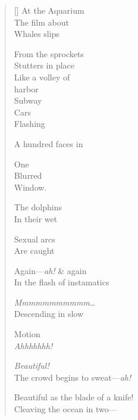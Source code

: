 \label{ch:later}
\settowidth{\versewidth}{Beautiful as the blade of a knife!}
\begin{verse}[\versewidth]
At the Aquarium\\
The film about\\
Whales slips

From the sprockets\\
Stutters in place\\
Like a volley of\\
harbor\\
Subway\\
Cars\\
Flashing

A hundred faces in

One\\
Blurred\\
Window.

The dolphins\\
In their wet

Sexual arcs\\
Are caught

Again---\textit{ah!} \& again\\
In the flash of instamatics

\textit{Mmmmmmmmmmm}\ldots\\
Descending in slow

Motion\\
\textit{Ahhhhhhh!}

\textit{Beautiful!}\\
The crowd begins to sweat---\textit{ah!}

Beautiful as the blade of a knife!\\
Cleaving the ocean in two---
\end{verse}
